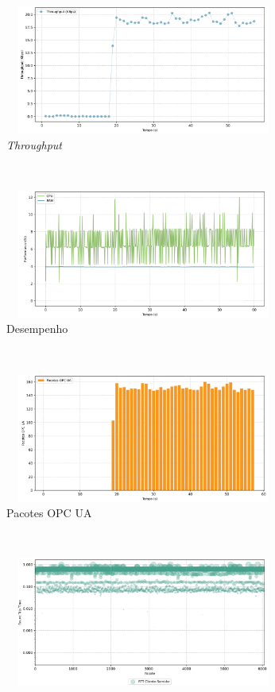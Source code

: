 \begin{apendicesenv}
\begin{figure}[htbp!]
    \centering
    \begin{subfigure}[t]{0.5\textwidth}
        \centering
        \includegraphics[width=1\textwidth, height=120pt]{USPSC-img/output/cropped/0-mitm_arp-tput.png}
        \caption{\textit{Throughput}}
    \end{subfigure}%
    ~ 
    \begin{subfigure}[t]{0.5\textwidth}
        \centering
        \includegraphics[width=1\textwidth, height=120pt]{USPSC-img/output/cropped/0-mitm_arp-perf.png}
        \caption{Desempenho}
    \end{subfigure}%
    \\
    \begin{subfigure}[t]{0.5\textwidth}
        \centering
        \includegraphics[width=1\textwidth, height=120pt]{USPSC-img/output/cropped/0-mitm_arp-pack.png}
        \caption{Pacotes OPC UA}
    \end{subfigure}%
    ~
    \begin{subfigure}[t]{0.5\textwidth}
        \centering
        \includegraphics[width=1\textwidth, height=120pt]{USPSC-img/output/cropped/0-mitm_arp-rttp.png}

\end{subfigure}
\end{figure}
\end{apendicesenv}
